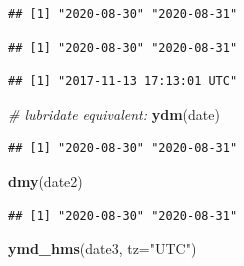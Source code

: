 \documentclass[]{article}
\newenvironment{Shaded}{\begin{snugshade}}{\end{snugshade}}
\newcommand{\CommentTok}[1]{\textcolor[rgb]{0.56,0.35,0.01}{\textit{#1}}}
\newcommand{\DataTypeTok}[1]{\textcolor[rgb]{0.13,0.29,0.53}{#1}}
\newcommand{\KeywordTok}[1]{\textcolor[rgb]{0.13,0.29,0.53}{\textbf{#1}}}
\newcommand{\NormalTok}[1]{#1}
\newcommand{\StringTok}[1]{\textcolor[rgb]{0.31,0.60,0.02}{#1}}
\begin{document}
\begin{verbatim}
## [1] "2020-08-30" "2020-08-31"
\end{verbatim}

\begin{Shaded}
\end{Shaded}

\begin{verbatim}
## [1] "2020-08-30" "2020-08-31"
\end{verbatim}

\begin{Shaded}
\end{Shaded}

\begin{verbatim}
## [1] "2017-11-13 17:13:01 UTC"
\end{verbatim}

\begin{Shaded}
\begin{Highlighting}[]
\CommentTok{# lubridate equivalent:}
\KeywordTok{ydm}\NormalTok{(date)}
\end{Highlighting}
\end{Shaded}

\begin{verbatim}
## [1] "2020-08-30" "2020-08-31"
\end{verbatim}

\begin{Shaded}
\begin{Highlighting}[]
\KeywordTok{dmy}\NormalTok{(date2)}
\end{Highlighting}
\end{Shaded}

\begin{verbatim}
## [1] "2020-08-30" "2020-08-31"
\end{verbatim}

\begin{Shaded}
\begin{Highlighting}[]
\KeywordTok{ymd_hms}\NormalTok{(date3, }\DataTypeTok{tz=}\StringTok{"UTC"}\NormalTok{)}
\end{Highlighting}
\end{Shaded}
\end{document}
